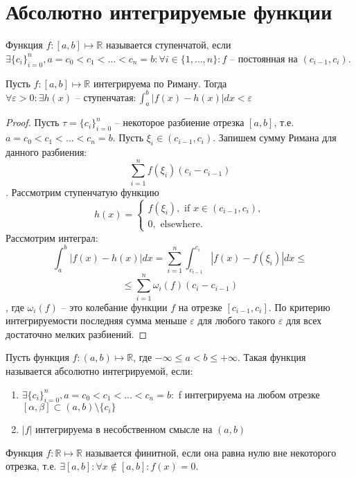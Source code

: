 \documentclass[document.tex]{subfiles}
\begin{document}
\section{Абсолютно интегрируемые функции}
\begin{definition}
Функция $f: [a, b] \mapsto \mathbb{R}$ называется ступенчатой, если $\exists \{c_i\}_{i=0}^n,
a = c_0 < c_1 < \ldots < c_n = b: \forall i \in \{1, \ldots, n\}: f\text{ -- постоянная на }(c_{i-1}, c_i)$.
\end{definition}

\begin{theorem}
Пусть $f : [a, b] \mapsto \mathbb{R}$ интегрируема по Риману. Тогда $\forall \varepsilon > 0: \exists h(x)\text{ -- ступенчатая} : \int_a^b|f(x)-h(x)|dx < \varepsilon$
\end{theorem}
\begin{proof}
Пусть $\tau = \{c_i\}_{i=0}^n$ -- некоторое разбиение отрезка $[a, b]$, т.е. $a = c_0 < c_1 < \ldots < c_n = b$. Пусть $\xi_i \in (c_{i - 1}, c_i)$. Запишем сумму Римана для данного разбиения:
$$\sum_{i=1}^n f(\xi_i)(c_i - c_{i-1})$$. Рассмотрим ступенчатую функцию
 $$h(x) = \begin{cases}
 	f(\xi_i),\text{ if } x \in (c_{i-1}, c_i),\\
 	0, \text{ elsewhere}.
\end{cases}$$
Рассмотрим интеграл:
$$\int_a^b|f(x)-h(x)|dx = \sum_{i=1}^n\int_{c_{i-1}}^{c_i}|f(x) - f(\xi_i)|dx \leq$$
$$\leq \sum_{i=1}^n\omega_i(f)(c_i - c_{i-1})$$,
где $\omega_i(f)$ -- это колебание функции $f$ на отрезке $[c_{i-1}, c_i]$. По критерию интегрируемости последняя сумма меньше $\varepsilon$ для любого такого $\varepsilon$ для всех достаточно мелких разбиений.
\end{proof}

\begin{definition}
Пусть функция $f: (a, b) \mapsto \mathbb{R}$, где $-\infty \leq a < b \leq +\infty$. Такая функция называется абсолютно интегрируемой, если:
\begin{enumerate}
\item $\exists \{c_i\}_{i=0}^n, a = c_0 < c_1 < \ldots < c_n = b:$ f интегрируема на любом отрезке $[\alpha, \beta] \subset (a, b) \setminus \{c_i\}$
\item $|f|$ интегрируема в несобственном смысле на $(a, b)$
\end{enumerate}
\end{definition}

\begin{definition}
Функция $f: \mathbb{R} \mapsto \mathbb{R}$ называется финитной, если она равна нулю вне некоторого отрезка, т.е. $\exists [a, b] : \forall x \not \in [a, b] : f(x) = 0$.
\end{definition}
\end{document}
